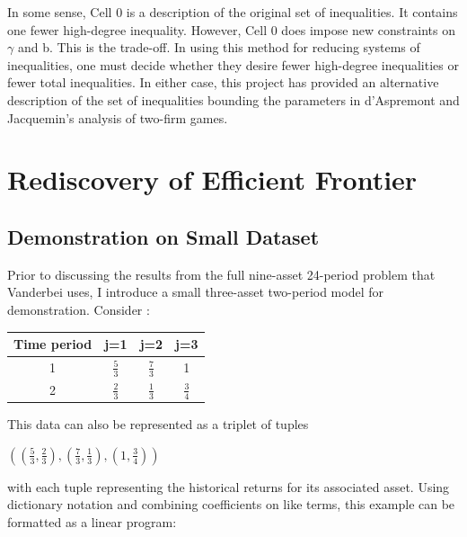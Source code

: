 \documentclass{article}
\begin{document}
In some sense, Cell 0 is a  description of the original set of inequalities. It contains one fewer high-degree inequality. However, Cell 0 does impose new constraints on $\gamma$ and b. This is the trade-off. In using this method for reducing systems of inequalities, one must decide whether they desire fewer high-degree inequalities or fewer total inequalities. In either case, this project has provided an alternative description of the set of inequalities bounding the parameters in d'Aspremont and Jacquemin's analysis of two-firm games.

\section{Rediscovery of Efficient Frontier}

\subsection{Demonstration on Small Dataset}

Prior to discussing the results from the full nine-asset 24-period problem that Vanderbei uses, I introduce a small three-asset two-period model for demonstration. Consider :


\begin{center} 
\begin{tabular}{ |c|c|c|c| } 
\hline
Time period & j=1 & j=2 & j=3 \\
\hline
1 & $\frac{5}{3}$ & $\frac{7}{3}$ & 1 \\[10pt]
2 & $\frac{2}{3}$ & $\frac{1}{3}$ & $\frac{3}{4}$\\
\hline
\end{tabular}
\end{center}

This data can also be represented as a triplet of tuples

\begin{center}
    $((\frac{5}{3}, \frac{2}{3}), (\frac{7}{3}, \frac{1}{3}), (1,\frac{3}{4}))$
\end{center}

with each tuple representing the historical returns for its associated asset. Using dictionary notation and combining coefficients on like terms, this example can be formatted as a linear program:
\end{document}
